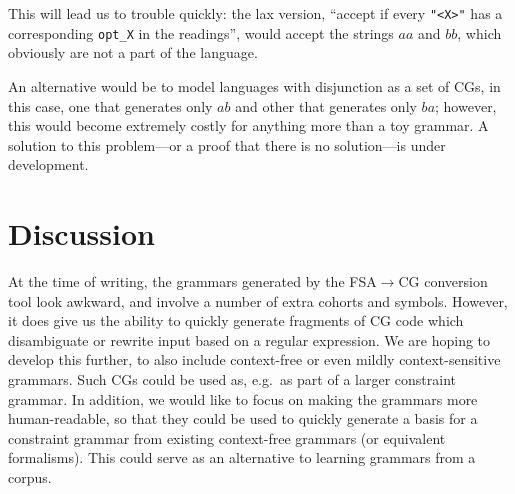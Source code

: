 \documentclass[11pt]{article}
\def\t#1{\texttt{#1}}
\begin{document}
This will lead us to trouble quickly: the lax version,
``accept if every \t{"<X>"} has a corresponding \t{opt\_X} in the readings'',
would accept the strings $aa$ and $bb$, which obviously are not a part of the
language.

An alternative would be to model languages with disjunction as a set of CGs,
in this case, one that generates only $ab$ and other that generates only $ba$;
however, this would become extremely costly for anything more than a toy grammar.
A solution to this problem---or a proof that there is no solution---is under
development.

\section{Discussion}

At the time of writing, the grammars generated by the FSA$\rightarrow$CG
conversion tool look awkward, and involve a number of extra cohorts and symbols.
However, it does give us the ability to quickly generate fragments of CG code
which disambiguate or rewrite input based on a regular expression.
We are hoping to develop this further, to also include context-free or even
mildly context-sensitive grammars.
Such CGs could be used as, e.g.\ as part of a larger constraint grammar.
In addition, we would like to focus on making the grammars more human-readable,
so that they could be used to quickly generate a basis for a constraint grammar
from existing context-free grammars (or equivalent formalisms).
This could serve as an alternative to learning grammars from a corpus.



\end{document}
